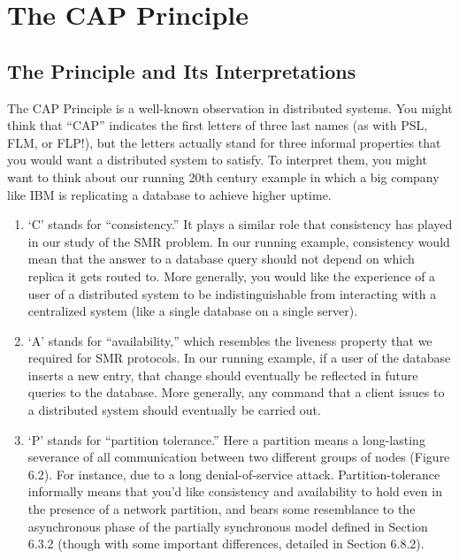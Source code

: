 \section{The CAP Principle}
\subsection{The Principle and Its Interpretations}
The CAP Principle is a well-known observation in distributed systems. You might think
that “CAP” indicates the first letters of three last names (as with PSL, FLM, or FLP!), but
the letters actually stand for three informal properties that you would want a distributed
system to satisfy. To interpret them, you might want to think about our running 20th century example in which a big company like IBM is replicating a database to achieve higher uptime.
\begin{enumerate}
    \item ‘C’ stands for “consistency.” It plays a similar role that consistency has played in our
study of the SMR problem. In our running example, consistency would mean that
the answer to a database query should not depend on which replica it gets routed to.
More generally, you would like the experience of a user of a distributed system to be
indistinguishable from interacting with a centralized system (like a single database on
a single server).
    \item ‘A’ stands for “availability,” which resembles the liveness property that we required for
SMR protocols. In our running example, if a user of the database inserts a new entry,
that change should eventually be reflected in future queries to the database. More
generally, any command that a client issues to a distributed system should eventually
be carried out.
    \item ‘P’ stands for “partition tolerance.” Here a partition means a long-lasting severance
of all communication between two different groups of nodes (Figure 6.2). For instance, 
due to a long denial-of-service attack. Partition-tolerance informally means that you’d
like consistency and availability to hold even in the presence of a network partition,
and bears some resemblance to the asynchronous phase of the partially synchronous model
defined in Section 6.3.2 (though with some important differences, detailed in Section 6.8.2).
\end{enumerate}


